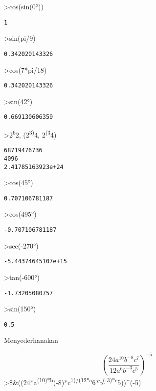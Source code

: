 \documentclass[
]{book}
\begin{document}
\textgreater cos(sin(0°))

\begin{verbatim}
1
\end{verbatim}

\textgreater sin(pi/9)

\begin{verbatim}
0.342020143326
\end{verbatim}

\textgreater cos(7*pi/18)

\begin{verbatim}
0.342020143326
\end{verbatim}

\textgreater sin(42°)

\begin{verbatim}
0.669130606359
\end{verbatim}

\textgreater2\textsuperscript{6}2, (2\textsuperscript{3)}4, 2\textsuperscript{(3}4)

\begin{verbatim}
68719476736
4096
2.41785163923e+24
\end{verbatim}

\textgreater cos(45°)

\begin{verbatim}
0.707106781187
\end{verbatim}

\textgreater cos(495°)

\begin{verbatim}
-0.707106781187
\end{verbatim}

\textgreater sec(-270°)

\begin{verbatim}
-5.44374645107e+15
\end{verbatim}

\textgreater tan(-600°)

\begin{verbatim}
-1.73205080757
\end{verbatim}

\textgreater sin(150°)

\begin{verbatim}
0.5
\end{verbatim}

Menyederhanakan

\[\left(\frac{24a^{10}b^{-8}c^7}{12a^6b^{-3}c^5}\right)^{-5}\]\textgreater\$\&((24*a\textsuperscript{(10)*b}(-8)*c\textsuperscript{7)/(12*a}6*b\textsuperscript{(-3)*c}5))\^{}(-5)
\end{document}
